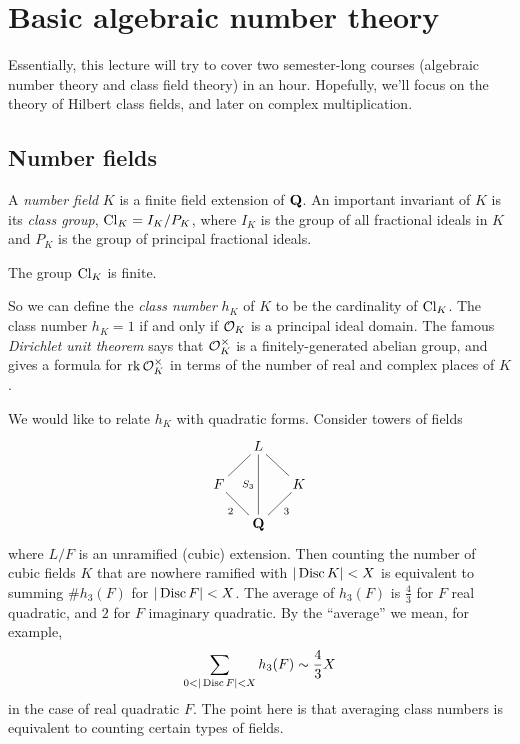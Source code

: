 
\section{Basic algebraic number theory}\label{sec:3}





Essentially, this lecture will try to cover two semester-long courses 
(algebraic number theory and class field theory) in an hour. Hopefully, we'll 
focus on the theory of Hilbert class fields, and later on complex 
multiplication. 





\subsection{Number fields}

A \emph{number field} $K$ is a finite field extension of $\mathbf{Q}$. An important 
invariant of $K$ is its \emph{class group}, $\operatorname{Cl}_K=I_K/P_K$, where 
$I_K$ is the group of all fractional ideals in $K$ and $P_K$ is the group of 
principal fractional ideals. 

\begin{theo}
The group $\operatorname{Cl}_K$ is finite. 
\end{theo}

So we can define the \emph{class number} $h_K$ of $K$ to be the cardinality 
of $\operatorname{Cl}_K$. The class number $h_K=1$ if and only if $\mathcal{O}_K$ is a principal 
ideal domain. The famous \emph{Dirichlet unit theorem} says that $\mathcal{O}_K^\times$ 
is a finitely-generated abelian group, and gives a formula for 
$\operatorname{rk}\mathcal{O}_K^\times$ in terms of the number of real and complex places of $K$. 

We would like to relate $h_K$ with quadratic forms. Consider towers of 
fields 
\[\xymatrix@=0.5cm{
  & L \\
  F \ar@{-}[ur] & & K \ar@{-}[ul] \\
  & \dQ \ar@{-}[ul]^-2 \ar@{-}[ur]_-3 \ar@{-}[uu]^-{S_3} 
}\]
where $L/F$ is an unramified (cubic) extension. Then counting the number of 
cubic fields $K$ that are nowhere ramified with $|\operatorname{Disc} K|<X$ is 
equivalent to summing $\# h_3(F)$ for $|\operatorname{Disc} F|<X$. The average of 
$h_3(F)$ is $\frac 4 3$ for $F$ real quadratic, and $2$ for $F$ imaginary 
quadratic. By the ``average'' we mean, for example, 
\[
  \sum_{0<|\discriminant F|<X} h_3(F) \sim \frac 4 3 X 
\]
in the case of real quadratic $F$. The point here is that averaging class 
numbers is equivalent to counting certain types of fields. 





